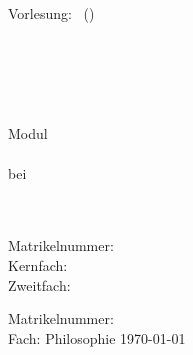 \ifdefined\layoutzettel
\pagestyle{empty}
\newcommand{\header}{Vorlesung: \vorlesung \hfill  \autor \, (\matrikelnummer)\\ \zettel \hfill \gruppe \\ \datum}
\header
\fi

\ifdefined\layouttitlepage
\thispagestyle{empty}
\begin{titlepage}
\singlespacing

\quad \\[4cm]

\begin{center}
\begin{minipage}{0.9\linewidth}
\begin{center}
\textsc{\MakeLowercase{\autor}} \\[1cm]
{%
    \scshape\Large\onehalfspacing
    \titel \par}
\end{center}
\end{minipage}

\vskip 3.8cm
\emph{\art}
\end{center}

\vfill

\noindent\begin{minipage}{0.5\linewidth}
Modul \emph{\modul} \\
\veranstaltung \\
bei \dozentin \\
\institut \\
\universitaet
\end{minipage}
\begin{minipage}{0.5\linewidth}
\begin{flushright}
\email \\
Matrikelnummer: \matrikelnummer \\
Kernfach:  \\
Zweitfach: \zweitfach \\
\datum
\end{flushright}
\end{minipage}
\end{titlepage}
\fi

\ifdefined\layoutanon
\begin{center}
\noindent\begin{minipage}{0.8\linewidth}
\begin{center}
\emph{\art}
\vskip 1.6cm
{%
    \Large\onehalfspacing
    \titel \par}
\vskip 3.5cm
Matrikelnummer: \matrikelnummer \\
Fach: Philosophie
\vskip 1.5cm
\today
\end{center}
\end{minipage}
\end{center}
\vfill
\fi

